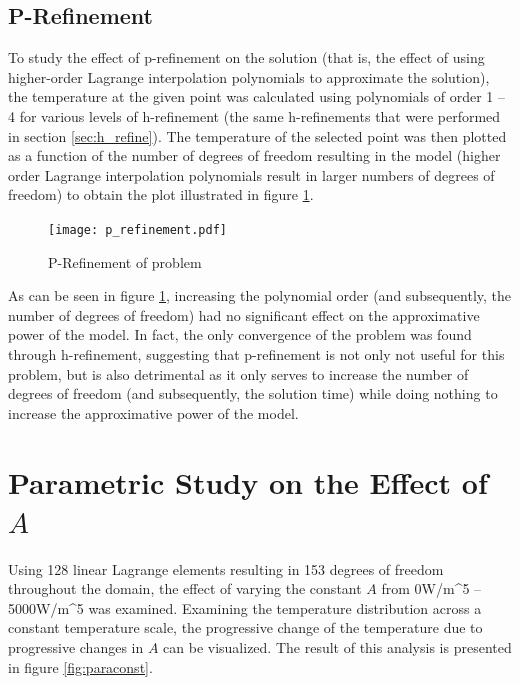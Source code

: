 \documentclass[letterpaper,10pt]{article}
\begin{document}
\subsection{P-Refinement}
To study the effect of p-refinement on the solution (that is, the effect of using higher-order Lagrange interpolation polynomials to approximate the solution), the temperature at the given point was calculated using polynomials of order 1 -- 4 for various levels of h-refinement (the same h-refinements that were performed in section \ref{sec:h_refine}). The temperature of the selected point was then plotted as a function of the number of degrees of freedom resulting in the model (higher order Lagrange interpolation polynomials result in larger numbers of degrees of freedom) to obtain the plot illustrated in figure \ref{fig:p_refinement}.

\begin{figure}[H]
	\centering
	\texttt{[image: p\_refinement.pdf]}
	\caption{P-Refinement of problem}
	\label{fig:p_refinement}
\end{figure}

As can be seen in figure \ref{fig:p_refinement}, increasing the polynomial order (and subsequently, the number of degrees of freedom) had no significant effect on the approximative power of the model. In fact, the only convergence of the problem was found through h-refinement, suggesting that p-refinement is not only not useful for this problem, but is also detrimental as it only serves to increase the number of degrees of freedom (and subsequently, the solution time) while doing nothing to increase the approximative power of the model.

\section{Parametric Study on the Effect of $A$}
Using 128 linear Lagrange elements resulting in 153 degrees of freedom throughout the domain, the effect of varying the constant $A$ from \unit{0}{W/m^5} -- \unit{5000}{W/m^5} was examined. Examining the temperature distribution across a constant temperature scale, the progressive change of the temperature due to progressive changes in $A$ can be visualized. The result of this analysis is presented in figure \ref{fig:paraconst}.
\end{document}
